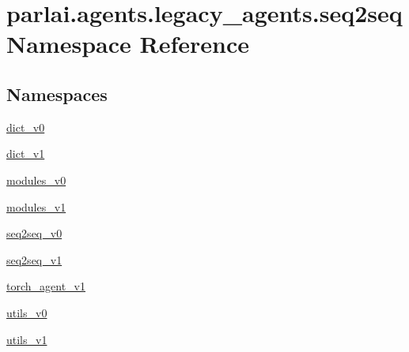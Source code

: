 \hypertarget{namespaceparlai_1_1agents_1_1legacy__agents_1_1seq2seq}{}\section{parlai.\+agents.\+legacy\+\_\+agents.\+seq2seq Namespace Reference}
\label{namespaceparlai_1_1agents_1_1legacy__agents_1_1seq2seq}
\subsection*{Namespaces}
\begin{DoxyCompactItemize}
\item 
 \hyperlink{namespaceparlai_1_1agents_1_1legacy__agents_1_1seq2seq_1_1dict__v0}{dict\+\_\+v0}
\item 
 \hyperlink{namespaceparlai_1_1agents_1_1legacy__agents_1_1seq2seq_1_1dict__v1}{dict\+\_\+v1}
\item 
 \hyperlink{namespaceparlai_1_1agents_1_1legacy__agents_1_1seq2seq_1_1modules__v0}{modules\+\_\+v0}
\item 
 \hyperlink{namespaceparlai_1_1agents_1_1legacy__agents_1_1seq2seq_1_1modules__v1}{modules\+\_\+v1}
\item 
 \hyperlink{namespaceparlai_1_1agents_1_1legacy__agents_1_1seq2seq_1_1seq2seq__v0}{seq2seq\+\_\+v0}
\item 
 \hyperlink{namespaceparlai_1_1agents_1_1legacy__agents_1_1seq2seq_1_1seq2seq__v1}{seq2seq\+\_\+v1}
\item 
 \hyperlink{namespaceparlai_1_1agents_1_1legacy__agents_1_1seq2seq_1_1torch__agent__v1}{torch\+\_\+agent\+\_\+v1}
\item 
 \hyperlink{namespaceparlai_1_1agents_1_1legacy__agents_1_1seq2seq_1_1utils__v0}{utils\+\_\+v0}
\item 
 \hyperlink{namespaceparlai_1_1agents_1_1legacy__agents_1_1seq2seq_1_1utils__v1}{utils\+\_\+v1}
\end{DoxyCompactItemize}
